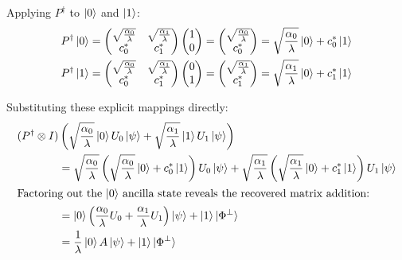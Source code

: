 Applying $P^\dagger$ to $\ket{0}$ and $\ket{1}$:
\begin{align*}
    P^\dagger\ket{0} = \begin{pmatrix} \sqrt{\frac{\alpha_0}{\lambda}} & \sqrt{\frac{\alpha_1}{\lambda}} \\ c_{0}^* & c_{1}^* \end{pmatrix} \begin{pmatrix} 1 \\ 0 \end{pmatrix} = \begin{pmatrix} \sqrt{\frac{\alpha_0}{\lambda}} \\ c_{0}^* \end{pmatrix} = \sqrt{\frac{\alpha_0}{\lambda}}\ket{0} + c_{0}^*\ket{1} \\
    P^\dagger\ket{1} = \begin{pmatrix} \sqrt{\frac{\alpha_0}{\lambda}} & \sqrt{\frac{\alpha_1}{\lambda}} \\ c_{0}^* & c_{1}^* \end{pmatrix} \begin{pmatrix} 0 \\ 1 \end{pmatrix} = \begin{pmatrix} \sqrt{\frac{\alpha_1}{\lambda}} \\ c_{1}^* \end{pmatrix} = \sqrt{\frac{\alpha_1}{\lambda}}\ket{0} + c_{1}^*\ket{1}
\end{align*}

Substituting these explicit mappings directly:
\begin{align*}
    (P^\dagger \otimes I) &\left( \sqrt{\frac{\alpha_0}{\lambda}}\ket{0}U_0\ket{\psi} + \sqrt{\frac{\alpha_1}{\lambda}}\ket{1}U_1\ket{\psi} \right) \nonumber \\
    &= \sqrt{\frac{\alpha_0}{\lambda}} \left( \sqrt{\frac{\alpha_0}{\lambda}}\ket{0} + c_0^*\ket{1} \right) U_0\ket{\psi} + \sqrt{\frac{\alpha_1}{\lambda}} \left( \sqrt{\frac{\alpha_1}{\lambda}}\ket{0} + c_1^*\ket{1} \right) U_1\ket{\psi} \nonumber \\
    \intertext{Factoring out the $\ket{0}$ ancilla state reveals the recovered matrix addition:}
    &= \ket{0} \left( \frac{\alpha_0}{\lambda} U_0 + \frac{\alpha_1}{\lambda} U_1 \right) \ket{\psi} + \ket{1}\ket{\Phi^\perp} \nonumber \\
    &= \frac{1}{\lambda} \ket{0} A \ket{\psi} + \ket{1}\ket{\Phi^\perp}
\end{align*}

